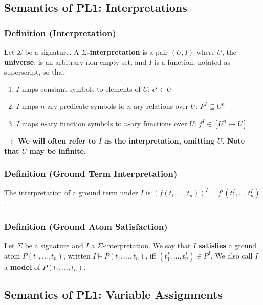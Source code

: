 \documentclass[conference, a4paper]{styles/acmsiggraph}
\begin{document}
    \subsection{Semantics of PL1: Interpretations}
        \subsubsection{Definition (Interpretation)}
            Let $\Sigma$ be a signature.
            A \textbf{$\Sigma$-interpretation} is a pair $(U,I)$ where $U$, the \textbf{universe}, is an arbitrary non-empty set, and $I$ is a function, notated as superscript, so that
            \begin{enumerate}
                \item $I$ maps constant symbols to elements of $U$: $c^I \in U$
                \item $I$ maps $n$-ary predicate symbols to $n$-ary relations over $U$: $P^I \subseteq U^n$
                \item $I$ maps $n$-ary function symbols to $n$-ary functions over $U$: $f^I \in [U^n \mapsto U]$
            \end{enumerate}
        \textbf{$\rightarrow$ We will often refer to $I$ as the interpretation, omitting $U$. Note that $U$ may be infinite.}
        
        \subsubsection{Definition (Ground Term Interpretation)}
            The interpretation of a ground term under $I$ is $(f(t_1,...,t_n))^I = f^I (t^I_1,...,t^I_n)$.
        
        \subsubsection{Definition (Ground Atom Satisfaction)}
            Let $\Sigma$ be a signature and $I$ a $\Sigma$-interpretation.\newline
            We say that $I$ \textbf{satisfies} a ground atom $P(t_1,...,t_n)$, written $I \vDash P(t_1,...,t_n)$, iff $(t^I_1,...,t^I_n) \in P^I$.\newline
            We also call $I$ a \textbf{model} of $P(t_1,...,t_n)$.
        
    
    \subsection{Semantics of PL1: Variable Assignments}
\end{document}
